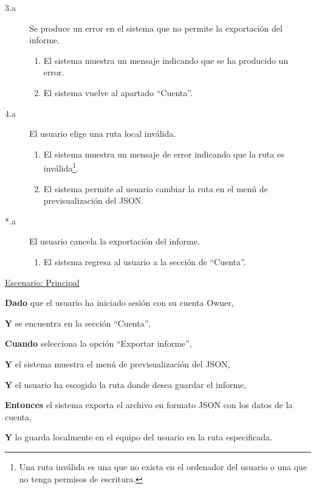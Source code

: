 \begin{description}
    \item[3.a] Se produce un error en el sistema que no permite la exportación del informe.
    \begin{enumerate}
        \item[3.a.1] El sistema muestra un mensaje indicando que se ha producido un error.
        \item[3.a.2] El sistema vuelve al apartado \enquote{Cuenta}.
    \end{enumerate}

    \newpage %

    \item[4.a] El usuario elige una ruta local inválida.
    \begin{enumerate}
        \item[4.a.1] El sistema muestra un mensaje de error indicando que la ruta es inválida\footnote{Una ruta inválida es una que no exista en el ordenador del usuario o una que no tenga permisos de escritura.}.
        \item[4.a.2] El sistema permite al usuario cambiar la ruta en el menú de previsualización del JSON.
    \end{enumerate}
    \item[*.a] El usuario cancela la exportación del informe.
    \begin{enumerate}
        \item[*.a.1] El sistema regresa al usuario a la sección de \enquote{Cuenta}.
    \end{enumerate}
\end{description}

\underline{Escenario: Principal}\par
\vspace{0.15cm}
\textbf{Dado} que el usuario ha iniciado sesión con su cuenta Owner,\par
\textbf{Y} se encuentra en la sección \enquote{Cuenta},\par
\textbf{Cuando} selecciona la opción \enquote{Exportar informe},\par
\textbf{Y} el sistema muestra el menú de previsualización del JSON,\par
\textbf{Y} el usuario ha escogido la ruta donde desea guardar el informe,\par
\textbf{Entonces} el sistema exporta el archivo en formato JSON con los datos de la cuenta,\par
\textbf{Y} lo guarda localmente en el equipo del usuario en la ruta especificada.\par
\vspace{0.20cm}

